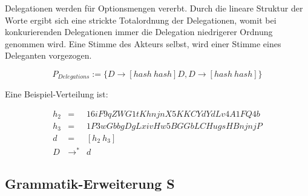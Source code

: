 \documentclass[a4paper,12pt]{report}
\begin{document}
Delegationen werden für Optionsmengen vererbt. Durch die lineare Struktur der Worte ergibt sich eine strickte Totalordnung der Delegationen, womit bei konkurierenden Delegationen immer die Delegation niedrigerer Ordnung genommen wird. Eine Stimme des Akteurs selbst, wird einer Stimme eines Deleganten vorgezogen.

\[ P_{Delegations} := \{D\rightarrow [hash\ hash]D,D\rightarrow [hash\ hash]\} \] 

Eine Beispiel-Verteilung ist: 

\begin{eqnarray}
  h_2 &=& 16iF9qZWG1tKhnjnX5KKCYdYdLv4A1FQ4b\\
  h_3 &=& 1P3wGbbgDgLxivHw5BGGbLCHugsHBnjnjP\\
  d &=& [h_2\ h_3] \\
  D &\rightarrow^*& d
\end{eqnarray}


% 
% 
% 




\subsection*{Grammatik-Erweiterung S}
% 
\end{document}
